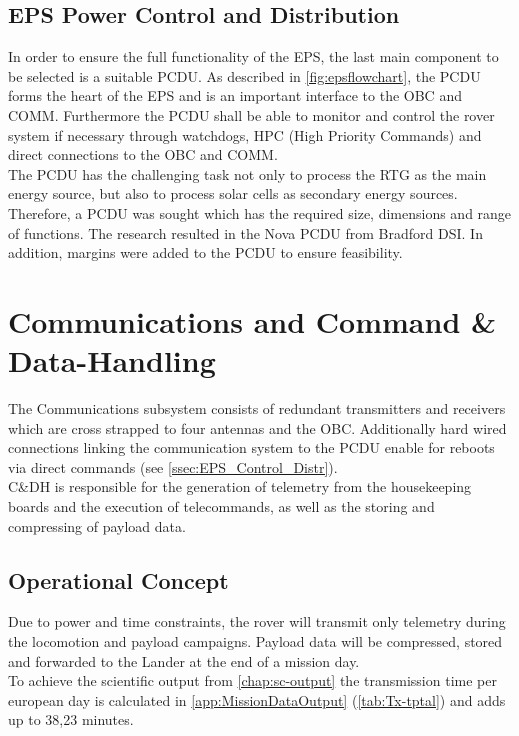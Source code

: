 \subsection{EPS Power Control and Distribution} 
\label{ssec:EPS_Control_Distr}
In order to ensure the full functionality of the EPS, the last main component to be selected is a suitable PCDU. As described in \autoref{fig:epsflowchart}, the PCDU forms the heart of the EPS and is an important interface to the OBC and COMM. Furthermore the PCDU shall be able to monitor and control the rover system if necessary through watchdogs, HPC (High Priority Commands) and direct connections to the OBC and COMM.\\
The PCDU has the challenging task not only to process the RTG as the main energy source, but also to process solar cells as secondary energy sources. Therefore, a PCDU was sought which has the required size, dimensions and range of functions. The research resulted in the Nova PCDU from Bradford DSI. In addition, margins were added to the PCDU to ensure feasibility\cite{BradfordSpace.2019}.

\section{Communications and Command \& Data-Handling}
\label{sec:comm}
The Communications subsystem consists of redundant transmitters and receivers which are cross strapped to four antennas and the OBC. Additionally hard wired connections linking the communication system to the PCDU enable for reboots via direct commands (see \autoref{ssec:EPS_Control_Distr}).\\
C\&DH is responsible for the generation of telemetry from the housekeeping boards and the execution of telecommands, as well as the storing and compressing of payload data. 

\subsection{Operational Concept}

Due to power and time constraints, the rover will transmit only telemetry during the locomotion and payload campaigns. Payload data will be compressed, stored and forwarded to the Lander at the end of a mission day. \\ 
 
To achieve the scientific output from \autoref{chap:sc-output} the transmission time per european day is calculated in \autoref{app:MissionDataOutput} (\autoref{tab:Tx-tptal}) and adds up to 38,23 minutes. 
	
